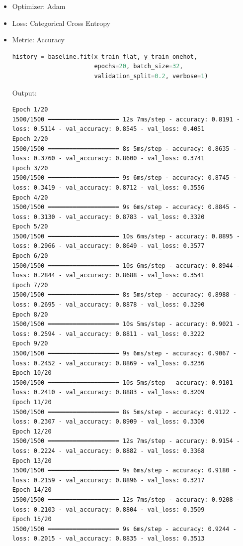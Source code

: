 \documentclass[11pt]{article}
\begin{document}
\begin{itemize}
\item Optimizer: Adam
\item Loss: Categorical Cross Entropy
\item Metric: Accuracy

\begin{lstlisting}[language=Python]
history = baseline.fit(x_train_flat, y_train_onehot,
                       epochs=20, batch_size=32,
                       validation_split=0.2, verbose=1)

\end{lstlisting}
Output:

\begin{verbatim}
Epoch 1/20
1500/1500 ━━━━━━━━━━━━━━━━━━━━ 12s 7ms/step - accuracy: 0.8191 - loss: 0.5114 - val_accuracy: 0.8545 - val_loss: 0.4051
Epoch 2/20
1500/1500 ━━━━━━━━━━━━━━━━━━━━ 8s 5ms/step - accuracy: 0.8635 - loss: 0.3760 - val_accuracy: 0.8600 - val_loss: 0.3741
Epoch 3/20
1500/1500 ━━━━━━━━━━━━━━━━━━━━ 9s 6ms/step - accuracy: 0.8745 - loss: 0.3419 - val_accuracy: 0.8712 - val_loss: 0.3556
Epoch 4/20
1500/1500 ━━━━━━━━━━━━━━━━━━━━ 9s 6ms/step - accuracy: 0.8845 - loss: 0.3130 - val_accuracy: 0.8783 - val_loss: 0.3320
Epoch 5/20
1500/1500 ━━━━━━━━━━━━━━━━━━━━ 10s 6ms/step - accuracy: 0.8895 - loss: 0.2966 - val_accuracy: 0.8649 - val_loss: 0.3577
Epoch 6/20
1500/1500 ━━━━━━━━━━━━━━━━━━━━ 10s 6ms/step - accuracy: 0.8944 - loss: 0.2844 - val_accuracy: 0.8688 - val_loss: 0.3541
Epoch 7/20
1500/1500 ━━━━━━━━━━━━━━━━━━━━ 8s 5ms/step - accuracy: 0.8988 - loss: 0.2695 - val_accuracy: 0.8878 - val_loss: 0.3290
Epoch 8/20
1500/1500 ━━━━━━━━━━━━━━━━━━━━ 10s 5ms/step - accuracy: 0.9021 - loss: 0.2594 - val_accuracy: 0.8811 - val_loss: 0.3222
Epoch 9/20
1500/1500 ━━━━━━━━━━━━━━━━━━━━ 9s 6ms/step - accuracy: 0.9067 - loss: 0.2452 - val_accuracy: 0.8869 - val_loss: 0.3236
Epoch 10/20
1500/1500 ━━━━━━━━━━━━━━━━━━━━ 10s 5ms/step - accuracy: 0.9101 - loss: 0.2410 - val_accuracy: 0.8883 - val_loss: 0.3209
Epoch 11/20
1500/1500 ━━━━━━━━━━━━━━━━━━━━ 8s 5ms/step - accuracy: 0.9122 - loss: 0.2307 - val_accuracy: 0.8909 - val_loss: 0.3300
Epoch 12/20
1500/1500 ━━━━━━━━━━━━━━━━━━━━ 12s 7ms/step - accuracy: 0.9154 - loss: 0.2224 - val_accuracy: 0.8882 - val_loss: 0.3368
Epoch 13/20
1500/1500 ━━━━━━━━━━━━━━━━━━━━ 9s 6ms/step - accuracy: 0.9180 - loss: 0.2159 - val_accuracy: 0.8896 - val_loss: 0.3217
Epoch 14/20
1500/1500 ━━━━━━━━━━━━━━━━━━━━ 12s 7ms/step - accuracy: 0.9208 - loss: 0.2103 - val_accuracy: 0.8804 - val_loss: 0.3509
Epoch 15/20
1500/1500 ━━━━━━━━━━━━━━━━━━━━ 9s 6ms/step - accuracy: 0.9244 - loss: 0.2015 - val_accuracy: 0.8835 - val_loss: 0.3513

\end{verbatim}
\end{itemize}
\end{document}
